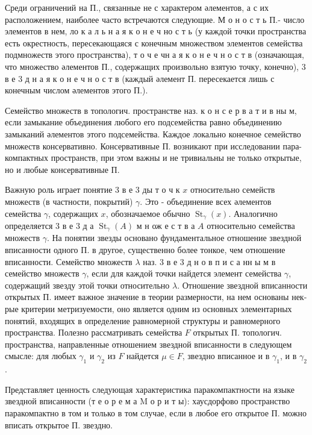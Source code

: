 \documentclass[10pt]{article}
\begin{document}
Среди ограничений на П., связанные не с характером әлементов, а с их расположением, наиболее часто встречаются следующие. М о н о с т ь П.- число элементов в нем, ло к а л ь н а я к о н е ч но с т ь (у каждой точки пространства есть окрестность, пересекающаяся с конечным множеством элементов семейства подмножеств этого пространства), т о ч е чн а я к о н е ч н о с т в (означающая, что множество әлементов П., содержащих произвольно взятую точку, конечно), 3 в е 3 д н а я к о н е ч н о с т в (каждый әлемент П. пересекается лишь с конечным числом әлементов этого П.).



Семейство множеств в топологич. пространстве наз. к о н с е р в а т и в ны м, если замыкание объединения любого его подсемейства равно объединению замыканий әлементов этого подсемейства. Каждое локально конечное семейство множеств консервативно. Консервативные П. возникают при исследовании пара- компактных пространств, при этом важны и не тривиальны не только открытые, но и любые консервативные П.



Важную роль играет понятие 3 в е 3 ды т о ч к $x$ относительно семейств множеств (в частности, покрытий) $\gamma$. Это - объединение всех әлементов семейства $\gamma$, содержащих $x$, обозначаемое обычно $\operatorname{St}_{\gamma}(x)$. Аналогично определяется 3 в е 3 д а $\operatorname{St}_{\gamma}(A)$ м н ож е с т в а $A$ относительно семейства множеств $\gamma$. На понятии звезды основано фундаментальное отношение звездной вписанности одного П. в другое, существенно более тонкое, чем отношение вписанности. Семейство множеств $\lambda$ наз. 3 в е 3 д н о в п и с а нн ы м в семейство множеств $\gamma$, если для каждой точки найдется элемент семейства $\gamma$, содержащий звезду этой точки относительно $\lambda$. Отношение звездной вписанности открытых П. имеет важное значение в теории размерности, на нем основаны нек-рые критерии метризуемости, оно является одним из основных элементарных понятий, входящих в определение равномерной структуры и равномерного пространства. Полезно рассматривать семейства $F$ открытых П. топологич. пространства, направленные отношением звездной вписанности в следующем смысле: для любых $\gamma_{1}$ и $\gamma_{2}$ из $F$ найдется $\mu \in F$, звездно вписанное и в $\gamma_{1}$, и в $\gamma_{2}$.



Представляет ценность следующая характеристика паракомпактности на языке звездной вписанности (т е о р е м а M о р и т ы): хаусдорфово пространство паракомпактно в том и только в том случае, если в любое его открытое П. можно вписать открытое П. звездно.
\end{document}
